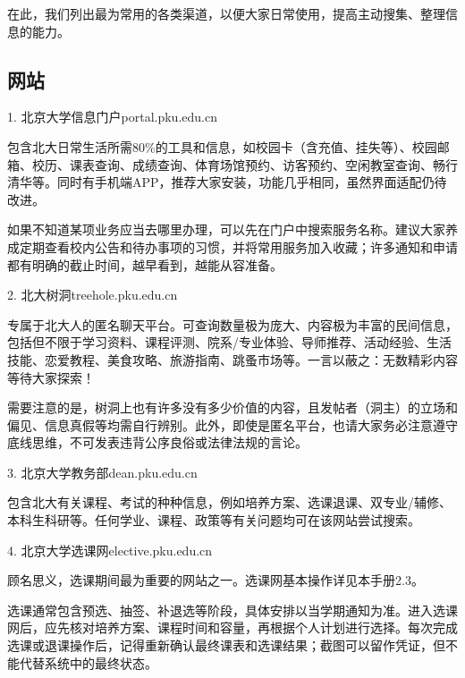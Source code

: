 \documentclass[11pt,oneside]{book}
\begin{document}
在此，我们列出最为常用的各类渠道，以便大家日常使用，提高主动搜集、整理信息的能力。

\subsection{网站}

1. 北京大学信息门户\quad portal.pku.edu.cn

包含北大日常生活所需80\%的工具和信息，如校园卡（含充值、挂失等）、校园邮箱、校历、课表查询、成绩查询、体育场馆预约、访客预约、空闲教室查询、畅行清华等。同时有手机端APP，推荐大家安装，功能几乎相同，虽然界面适配仍待改进。

如果不知道某项业务应当去哪里办理，可以先在门户中搜索服务名称。建议大家养成定期查看校内公告和待办事项的习惯，并将常用服务加入收藏；许多通知和申请都有明确的截止时间，越早看到，越能从容准备。

\vspace{10pt}

2. 北大树洞\quad treehole.pku.edu.cn

专属于北大人的匿名聊天平台。可查询数量极为庞大、内容极为丰富的民间信息，包括但不限于学习资料、课程评测、院系/专业体验、导师推荐、活动经验、生活技能、恋爱教程、美食攻略、旅游指南、跳蚤市场等。一言以蔽之：无数精彩内容等待大家探索！

需要注意的是，树洞上也有许多没有多少价值的内容，且发帖者（洞主）的立场和偏见、信息真假等均需自行辨别。此外，即使是匿名平台，也请大家务必注意遵守底线思维，不可发表违背公序良俗或法律法规的言论。

\vspace{10pt}

3. 北京大学教务部\quad dean.pku.edu.cn

包含北大有关课程、考试的种种信息，例如培养方案、选课退课、双专业/辅修、本科生科研等。任何学业、课程、政策等有关问题均可在该网站尝试搜索。

\vspace{10pt}

4. 北京大学选课网\quad elective.pku.edu.cn

顾名思义，选课期间最为重要的网站之一。选课网基本操作详见本手册2.3。

选课通常包含预选、抽签、补退选等阶段，具体安排以当学期通知为准。进入选课网后，应先核对培养方案、课程时间和容量，再根据个人计划进行选择。每次完成选课或退课操作后，记得重新确认最终课表和选课结果；截图可以留作凭证，但不能代替系统中的最终状态。

\vspace{10pt}
\end{document}
